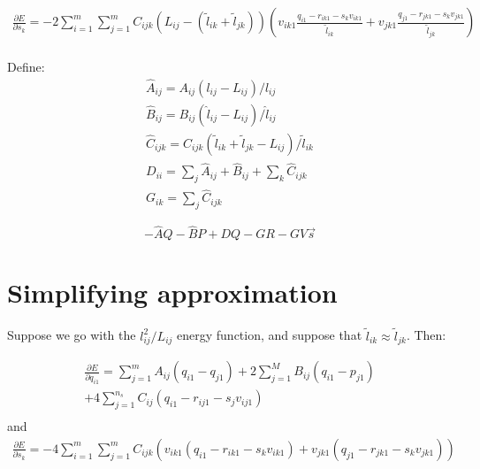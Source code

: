 \documentclass{article}
\begin{document}
\begin{equation}
  \begin{split}
    \frac{\partial E}{\partial s_k} = 
    - 2\sum_{i=1}^m \sum_{j=1}^mC_{ijk} \left(L_{ij} -
      (\tilde l_{ik} + \tilde l_{jk}) 
    \right)  \left(v_{ik1} \frac{q_{i1} - r_{ik1} - s_k v_{ik1}}{\tilde
      l_{ik}} 
    + v_{jk1} \frac{q_{j1} - r_{jk1} - s_k v_{jk1}}{\tilde l_{jk}} \right)
\\
  \end{split}
\end{equation}

Define:
\begin{equation}
  \label{fold-retina:eq:6}
  \begin{split}
      \hat A_{ij} = A_{ij}(l_{ij}-L_{ij})/l_{ij} \\
      \hat B_{ij} = B_{ij}(\hat l_{ij}-L_{ij})/\hat l_{ij} \\
      \hat C_{ijk} = C_{ijk}(\tilde l_{ik} + \tilde l_{jk} -L_{ij})/\tilde l_{ik} \\
      D_{ii} = \sum_j \hat A_{ij} + \hat B_{ij} +  \sum_k \hat C_{ijk}
      \\
      G_{ik} = \sum_j \hat C_{ijk} 
    \end{split}
\end{equation}


\begin{equation}
  \label{fold-retina:eq:7}
  -\hat A Q  -\hat B P + D Q - GR - GV\vec{s}
\end{equation}

\section{Simplifying approximation}
\label{fold-retina:sec:simpl-appr}

Suppose we go with the $l_{ij}^2/L_{ij}$ energy function, and suppose
that $\tilde l_{ik}\approx \tilde l_{jk}$. Then:

\begin{equation}
  \begin{split}
    \frac{\partial E}{\partial q_{i1}} = 
    \sum_{j=1}^m A_{ij} (q_{i1} - q_{j1})
    + 2\sum_{j=1}^M B_{ij} (q_{i1} - p_{j1}) \\
    + 4\sum_{j=1}^{n_s}C_{ij} 
    (q_{i1} - r_{ij1} - s_j v_{ij1}) \\
  \end{split}
\end{equation}
and
\begin{equation}
  \begin{split}
    \frac{\partial E}{\partial s_k} = 
    - 4\sum_{i=1}^m \sum_{j=1}^mC_{ijk} \left(
      v_{ik1} (q_{i1} - r_{ik1} - s_k v_{ik1})
    + v_{jk1} (q_{j1} - r_{jk1} - s_k v_{jk1}) \right)
\\
  \end{split}
\end{equation}
\end{document}
